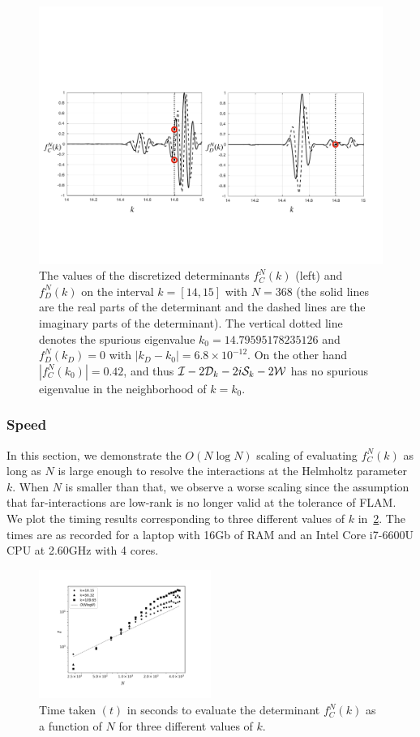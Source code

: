 \begin{figure}
\centering
\includegraphics[width=0.98\linewidth]{det_spur.pdf}
\caption{The values of the discretized determinants $f_{C}^{N}(k)$ (left)
and $f_{D}^{N}(k)$ on the interval {\color{red} $k=[14,15]$} with $N=368$ 
{\color{red}(the 
solid lines are the real parts of the determinant and the dashed lines
are the imaginary parts of the determinant)}. The vertical
dotted line denotes the spurious eigenvalue $k_{0} = 14.79595178235126$ 
and $f_{D}^{N}(k_{D}) = 0$ with $|k_{D}-k_{0}|=6.8\times 10^{-12}$.
On the other hand $|f_{C}^{N}(k_{0})|=0.42$, and thus $\mathcal I-2{\mathcal D}_{k}-2i{\mathcal S}_{k} 
-2{\mathcal W}$ has no 
spurious eigenvalue in the neighborhood of $k=k_{0}$.}
\label{fig:spur}
\end{figure}

\subsubsection{Speed}
\label{subsec:speed}
In this section, we demonstrate the $O(N\log{N})$ scaling of evaluating
$f^{N}_{C}(k)$ as long as $N$ is large enough to resolve the interactions
at the Helmholtz parameter $k$. 
When $N$ is smaller than that, we observe a worse scaling since the
assumption that far-interactions are low-rank is no longer valid at
the tolerance of FLAM.
We plot the timing results corresponding to three different values of 
$k$ in~\cref{fig:speed}. The times are as recorded for a laptop with
16Gb of RAM and an Intel Core i7-6600U CPU at 2.60GHz with 4 cores.
\begin{figure}
\centering
\includegraphics[width=0.5\textwidth]{speed_res.pdf}
\caption{Time taken $(t)$ in seconds to evaluate the determinant $f_{C}^{N}(k)$ as
a function of $N$ for three different values of $k$.}
\label{fig:speed}
\end{figure}

